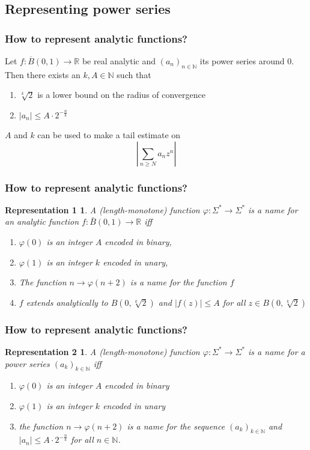 \documentclass[xcolor=pdftex,dvipsnames,table]{beamer}
\newcommand{\N}{\ensuremath{\mathbb{N}}}
\newcommand{\R}{\ensuremath{\mathbb{R}}}
\newcommand{\abs}[1]{\left|#1\right|}
\newtheorem{representation1}{Representation 1}
\newtheorem{representation2}{Representation 2}
\begin{document}
\subsection{Representing power series}
\begin{frame}
\frametitle{How to represent analytic functions?}
\begin{lemma}
  Let $f : \overline B(0,1) \to \R$ be real analytic and $(a_n)_{n \in \N}$ its power series around $0$.\\
  Then there exists an $k,A \in \N$ such that 
  \begin{enumerate}
  \item $\sqrt[k]{2}$ is a lower bound on the radius of convergence
  \item $\abs{a_n} \leq A \cdot 2^{-\frac{n}{k}}$
  \end{enumerate}
\end{lemma}
\pause
$A$ and $k$ can be used to make a tail estimate on
$$ \left | \sum_{n \geq N} a_n z^n \right |  $$
\end{frame}
\begin{frame}
\frametitle{How to represent analytic functions?}
\begin{representation1}
  A (length-monotone) function $\varphi: \Sigma^* \to \Sigma^*$ is a name for an analytic function $f:\bar B(0,1) \to \R$ iff
  \begin{enumerate}
  \item $\varphi(0)$ is an integer $A$ encoded in binary,
  \item $\varphi(1)$ is an integer $k$ encoded in unary,
  \item The function $n \to \varphi(n+2)$ is a name for the function $f$
  \item $f$ extends analytically to $B(0, \sqrt[k]{2})$ and $\abs{f(z)} \leq A$ for all $z \in B(0, \sqrt[k]{2})$
  \end{enumerate}

\end{representation1}
\end{frame}
\begin{frame}
\frametitle{How to represent analytic functions?}
\begin{representation2}
  A (length-monotone) function $\varphi: \Sigma^* \to \Sigma^*$ is a name for a power series $(a_k)_{k \in \N}$ iff
  \begin{enumerate}
  \item $\varphi(0)$ is an integer $A$ encoded in binary
  \item $\varphi(1)$ is an integer $k$ encoded in unary
  \item the function $n \to \varphi(n+2)$ is a name for the sequence $(a_k)_{k \in \N}$ and
  $\abs{a_n} \leq A \cdot 2^{-\frac{n}{k}}$ for all $n \in \N$.
  \end{enumerate}
\end{representation2}
\end{frame}
\end{document}

